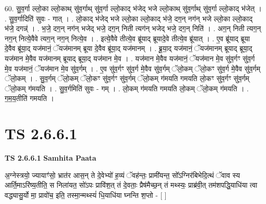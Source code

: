 \documentclass[17pt]{extarticle}
\begin{document}
60. सु॒व॒र्गा ल्लो॒का ल्लो॒काथ् सु॑व॒र्गाथ् सु॑व॒र्गा ल्लो॒काद् भ॑जेद् भजे ल्लो॒काथ् सु॑व॒र्गाथ् सु॑व॒र्गा ल्लो॒काद् भ॑जेत् । . सु॒व॒र्गादिति॑ सुवः - गात् । . लो॒काद् भ॑जेद् भजे ल्लो॒का ल्लो॒काद् भ॑जे॒ दग॒न् नग॑न् भजे ल्लो॒का ल्लो॒काद् भ॑जे॒ दगन्न्॑ । . भ॒जे॒ दग॒न् नग॑न् भजेद् भजे॒ दग॒न् निती त्यग॑न् भजेद् भजे॒ दग॒न् निति॑ । . अग॒न् निती त्यग॒न् नग॒न् नित्ये॒वैवे त्यग॒न् नग॒न् नित्ये॒व । . इत्ये॒वैवे तीत्ये॒व ब्रू॑याद् ब्रूयादे॒वे तीत्ये॒व ब्रू॑यात् । . ए॒व ब्रू॑याद् ब्रूया दे॒वैव ब्रू॑या॒द् यज॑मानं॒ ॅयज॑मानम् ब्रूया दे॒वैव ब्रू॑या॒द् यज॑मानम् । . ब्रू॒या॒द् यज॑मानं॒ ॅयज॑मानम् ब्रूयाद् ब्रूया॒द् यज॑मान मे॒वैव यज॑मानम् ब्रूयाद् ब्रूया॒द् यज॑मान मे॒व । . यज॑मान मे॒वैव यज॑मानं॒ ॅयज॑मान मे॒व सु॑व॒र्गꣳ सु॑व॒र्ग मे॒व यज॑मानं॒ ॅयज॑मान मे॒व सु॑व॒र्गम् । . ए॒व सु॑व॒र्गꣳ सु॑व॒र्ग मे॒वैव सु॑व॒र्गम् ॅलो॒कम् ॅलो॒कꣳ सु॑व॒र्ग मे॒वैव सु॑व॒र्गम् ॅलो॒कम् । . सु॒व॒र्गम् ॅलो॒कम् ॅलो॒कꣳ सु॑व॒र्गꣳ सु॑व॒र्गम् ॅलो॒कम् ग॑मयति गमयति लो॒कꣳ सु॑व॒र्गꣳ सु॑व॒र्गम् ॅलो॒कम् ग॑मयति । . सु॒व॒र्गमिति॑ सुवः - गम् । . लो॒कम् ग॑मयति गमयति लो॒कम् ॅलो॒कम् ग॑मयति । . ग॒म॒य॒तीति॑ गमयति । \newline
\pagebreak
{}

\section{ TS 2.6.6.1 }

\textbf{TS 2.6.6.1 } \newline
\textbf{Samhita Paata} \newline

अ॒ग्नेस्त्रयो॒ ज्यायाꣳ॑सो॒ भ्रात॑र आस॒न् ते दे॒वेभ्यो॑ ह॒व्यं ॅवह॑न्तः॒ प्रामी॑यन्त॒ सो᳚ऽग्निर॑बिभेदि॒त्थं ॅवाव स्य आर्ति॒माऽरि॑ष्य॒तीति॒ स निला॑यत॒ सो॑ऽपः प्रावि॑श॒त् तं दे॒वताः॒ प्रैष॑मैच्छ॒न् तं मथ्स्यः॒ प्राब्र॑वी॒त् तम॑शपद्धि॒याधि॑या त्वा वद्ध्यासु॒र्यो मा॒ प्रावो॑च॒ इति॒ तस्मा॒न्मथ्स्यं॑ धि॒याधि॑या घ्नन्ति श॒प्तो - [  ] \newline
\end{document}
